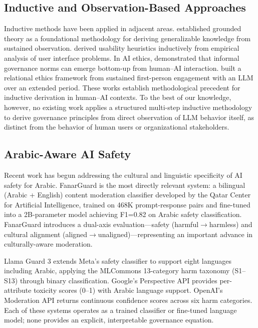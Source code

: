 \documentclass[11pt,a4paper]{article}
\begin{document}
\subsection{Inductive and Observation-Based Approaches}

Inductive methods have been applied in adjacent areas. \citet{glaser1967} established grounded theory as a foundational methodology for deriving generalizable knowledge from sustained observation. \citet{nielsen1990} derived usability heuristics inductively from empirical analysis of user interface problems. In AI ethics, \citet{yip2024} demonstrated that informal governance norms can emerge bottom-up from human--AI interaction. \citet{hammons2026} built a relational ethics framework from sustained first-person engagement with an LLM over an extended period. These works establish methodological precedent for inductive derivation in human--AI contexts. To the best of our knowledge, however, no existing work applies a structured multi-step inductive methodology to derive governance principles from direct observation of LLM behavior itself, as distinct from the behavior of human users or organizational stakeholders.

\subsection{Arabic-Aware AI Safety}

Recent work has begun addressing the cultural and linguistic specificity of AI safety for Arabic. FanarGuard \citep{fanarguard2025} is the most directly relevant system: a bilingual (Arabic + English) content moderation classifier developed by the Qatar Center for Artificial Intelligence, trained on 468K prompt-response pairs and fine-tuned into a 2B-parameter model achieving F1=0.82 on Arabic safety classification. FanarGuard introduces a dual-axis evaluation---safety (harmful$\to$harmless) and cultural alignment (aligned$\to$unaligned)---representing an important advance in culturally-aware moderation.

Llama Guard 3 \citep{llamaguard2024} extends Meta's safety classifier to support eight languages including Arabic, applying the MLCommons 13-category harm taxonomy (S1--S13) through binary classification. Google's Perspective API \citep{perspective2017} provides per-attribute toxicity scores (0--1) with Arabic language support. OpenAI's Moderation API returns continuous confidence scores across six harm categories. Each of these systems operates as a trained classifier or fine-tuned language model; none provides an explicit, interpretable governance equation.
\end{document}
